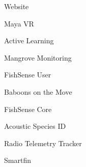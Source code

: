 \item Website
\item Maya VR
\item Active Learning
\item Mangrove Monitoring
\item FishSense User
\item Baboons on the Move
\item FishSense Core
\item Acoustic Species ID
\item Radio Telemetry Tracker
\item Smartfin
